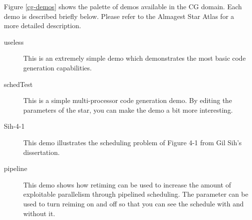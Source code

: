 Figure \ref{cg-demos} shows the palette of demos available in the
CG domain.  Each demo is described briefly below.  Please refer to the
Almagest Star Atlas for a more detailed description.

\begin{description}
\item[useless]
This is an extremely simple demo which demonstrates
the most basic code generation capabilities.

\item[schedTest]
This is a simple multi-processor code generation demo.  By editing the
parameters of the  star, you can make the demo a bit more
interesting.

\item[Sih-4-1]
This demo illustrates the scheduling problem of Figure 4-1 from Gil Sih's
dissertation.

\item[pipeline]
This demo shows how retiming can be used to increase the amount of
exploitable parallelism through pipelined scheduling.  The 
parameter can be used to turn reiming on and off so that you can see
the schedule with and without it.

\end{description}
